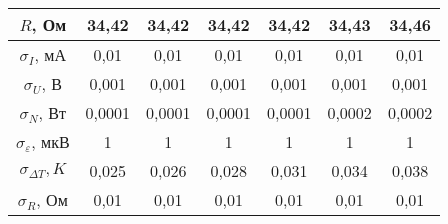 \documentclass[a4paper,12pt]{article}
\begin{document}
\begin{enumerate}
\begin{center}
\begin{tabular}{|c|c|c|c|c|c|c|}
				$R$, Ом 			& 34,42 	& 34,42		& 34,42		& 34,42  & 34,43	& 34,46	 \\ \hline
				$\sigma_I$, мА 				& 0,01 	 & 0,01   	& 0,01 		& 0,01	 & 0,01		& 0,01	\\ \hline
				$\sigma_U$, В 				& 0,001  & 0,001  	& 0,001 	& 0,001  & 0,001 	& 0,001 \\ \hline
				$\sigma_N$, Вт 				& 0,0001 & 0,0001 	& 0,0001 	& 0,0001 & 0,0002 	& 0,0002 \\ \hline
				$\sigma_\varepsilon$, мкВ 	& 1 	 & 1 	  	& 1 		& 1 	 & 1 		& 1		\\ \hline
				$\sigma_{\Delta T}, K$ 		& 0,025  & 0,026	& 0,028		& 0,031	 & 0,034	& 0,038 \\ \hline
				$\sigma_R$, Ом 				& 0,01 	 & 0,01 	& 0,01 		& 0,01	 & 0,01 	& 0,01 \\ \hline
			\end{tabular}

		\end{center}
	\end{enumerate}
\end{document}
